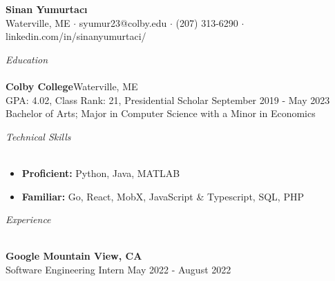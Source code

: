 \documentclass[letterpaper]{article}
\newcommand{\lineunder} {
    \vspace*{-8pt} \\
    \hspace*{-3pt} \hrulefill \\
}
\newcommand{\header} [1] {
	{\hspace*{-3pt}\vspace*{6pt} \textit{#1}}
    \vspace*{-6pt} \lineunder
}
\begin{document}
\vspace*{-40pt}


\vspace*{-10pt}
\begin{center}
	{\Large \textbf {Sinan Yumurtacı}}\\
	Waterville, ME $\cdot$ syumur23@colby.edu $\cdot$ (207) 313-6290 $\cdot$ linkedin.com/in/sinanyumurtaci/\\
\end{center}




\header{Education}
\textbf{Colby College}\hfill Waterville, ME\\
GPA: 4.02, Class Rank: 21, Presidential Scholar \hfill September 2019 - May 2023\\
Bachelor of Arts; Major in Computer Science with a Minor in Economics \\

\vspace{3mm}



\header{Technical Skills}
\vspace{-2mm}
\begin{itemize} \itemsep -1pt
\item \textbf{Proficient:} Python, Java, MATLAB\\
\item \textbf{Familiar:} Go, React, MobX, JavaScript \& Typescript, SQL, PHP\\
\end{itemize}



\newcommand{\expheader}[4]{
    \textbf{#1 \hfill #2}\\
    #3 \hfill #4\\
    \vspace{-1mm}
}
\header{Experience}
\vspace{1mm}

\expheader{Google}{Mountain View, CA}{Software Engineering Intern}{May 2022 - August 2022}

%
\end{document}
